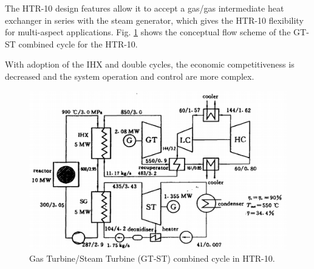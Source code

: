The HTR-10 design features allow it to accept a gas/gas intermediate heat exchanger in series with the steam generator, which gives the HTR-10 flexibility for multi-aspect applications. Fig. \ref{fig:gtst} shows the conceptual flow scheme of the GT-ST combined cycle for the HTR-10.

With adoption of the IHX and double cycles, the economic competitiveness is decreased and the system operation and control are more complex.

\cite{yuanhui_htgr_1996}

\begin{figure}[H]
	\centering
	\includegraphics[width=0.4\linewidth]{figures/htgr-gtst.png}
	\hfill
	\caption{Gas Turbine/Steam Turbine (GT-ST) combined cycle in HTR-10.}
	\label{fig:gtst}
\end{figure}
